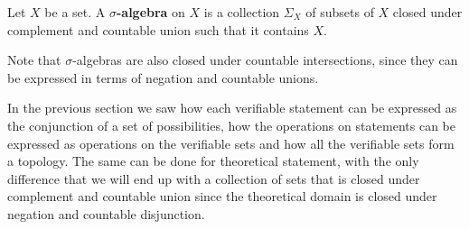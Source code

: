 \documentclass[11pt,letterpaper,fleqn]{memoir} %
\begin{document}
\begin{mathSection}
	\begin{defn}
		Let $X$ be a set. A \textbf{$\sigma$-algebra} on $X$ is a collection $\Sigma_X$ of subsets of $X$ closed under complement and countable union such that it contains $X$.
	\end{defn}
\end{mathSection}

Note that $\sigma$-algebras are also closed under countable intersections, since they can be expressed in terms of negation and countable unions.

In the previous section we saw how each verifiable statement can be expressed as the conjunction of a set of possibilities, how the operations on statements can be expressed as operations on the verifiable sets and how all the verifiable sets form a topology. The same can be done for theoretical statement, with the only difference that we will end up with a collection of sets that is closed under complement and countable union since the theoretical domain is closed under negation and countable disjunction.
\end{document}
